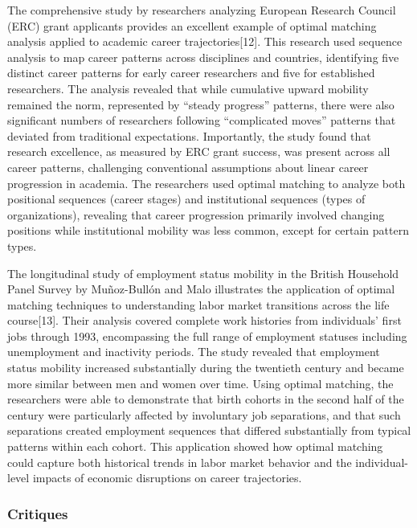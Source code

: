 \documentclass[./main.tex]{subfiles}
\begin{document}
The comprehensive study by researchers analyzing European Research
Council (ERC) grant applicants provides an excellent example of optimal
matching analysis applied to academic career trajectories{[}12{]}. This
research used sequence analysis to map career patterns across
disciplines and countries, identifying five distinct career patterns for
early career researchers and five for established researchers. The
analysis revealed that while cumulative upward mobility remained the
norm, represented by ``steady progress'' patterns, there were also
significant numbers of researchers following ``complicated moves''
patterns that deviated from traditional expectations. Importantly, the
study found that research excellence, as measured by ERC grant success,
was present across all career patterns, challenging conventional
assumptions about linear career progression in academia. The researchers
used optimal matching to analyze both positional sequences (career
stages) and institutional sequences (types of organizations), revealing
that career progression primarily involved changing positions while
institutional mobility was less common, except for certain pattern
types.

The longitudinal study of employment status mobility in the British
Household Panel Survey by Muñoz-Bullón and Malo illustrates the
application of optimal matching techniques to understanding labor market
transitions across the life course{[}13{]}. Their analysis covered
complete work histories from individuals' first jobs through 1993,
encompassing the full range of employment statuses including
unemployment and inactivity periods. The study revealed that employment
status mobility increased substantially during the twentieth century and
became more similar between men and women over time. Using optimal
matching, the researchers were able to demonstrate that birth cohorts in
the second half of the century were particularly affected by involuntary
job separations, and that such separations created employment sequences
that differed substantially from typical patterns within each cohort.
This application showed how optimal matching could capture both
historical trends in labor market behavior and the individual-level
impacts of economic disruptions on career trajectories.

\subsubsection{Critiques}\label{critiques}
\end{document}
